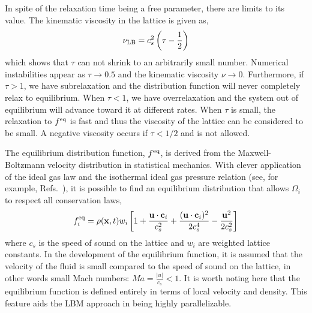 In spite of the relaxation time being a free parameter, there are limits to its value. The kinematic viscosity in the lattice is given as,
\begin{equation}
	\nu_{\text{LB}} = c_s^2\left(\tau-\frac{1}{2}\right)
\end{equation}
which shows that $\tau$ can not shrink to an arbitrarily small number. Numerical instabilities appear as $\tau \rightarrow 0.5$ and the kinematic viscosity $\nu \rightarrow 0$. Furthermore, if $\tau > 1$, we have subrelaxation and the distribution function will never completely relax to equilibrium. When $\tau < 1$, we have overrelaxation and the system out of equilibrium will advance toward it at different rates. When $\tau$ is small, the relaxation to $f^{\text{eq}}$ is fast and thus the viscosity of the lattice can be considered to be small. A negative viscosity occurs if $\tau < 1/2$ and is not allowed.\cite{Chopard2002,Chen1998a}

The equilibrium distribution function, $f^{\text{eq}}$, is derived from the Maxwell-Boltzmann velocity distribution in statistical mechanics. With clever application of the ideal gas law and the isothermal ideal gas pressure relation (see, for example, Refs.~\cite{Viggen2009,Chopard2002}), it is possible to find an equilibrium distribution that allows $\Omega_i$ to respect all conservation laws,
\begin{equation}\label{eq:equilib-dist-function}
	f_i^{\text{eq}} = \rho(\mathbf{x},t)w_i\left[1+\frac{\mathbf{u}\cdot\mathbf{c}_i}{c_s^2} + \frac{(\mathbf{u}\cdot\mathbf{c}_i)^2}{2c_s^4} - \frac{\mathbf{u}^2}{2c_s^2} \right]
\end{equation}
where $c_s$ is the speed of sound on the lattice and $w_i$ are weighted lattice constants. In the development of the equilibrium function, it is assumed that the velocity of the fluid is small compared to the speed of sound on the lattice, in other words small Mach numbers: $Ma = \frac{|u|}{c_s} < 1$.\cite{qian1992lattice,Chen1998a} It is worth noting here that the equilibrium function is defined entirely in terms of local velocity and density. This feature aids the LBM approach in being highly parallelizable.

